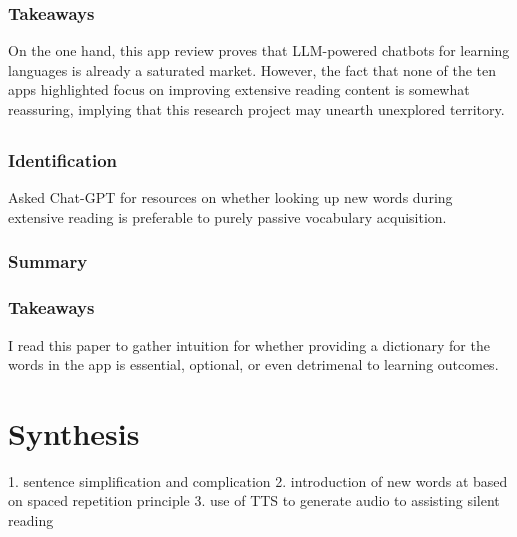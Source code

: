 \documentclass[
	letterpaper, %
]{jdf}
\begin{document}
\subsubsection{Takeaways}
On the one hand, this app review proves that LLM-powered chatbots for learning languages is already a saturated market. However, the fact that none of the ten apps highlighted focus on improving extensive reading content is somewhat reassuring, implying that this research project may unearth unexplored territory.

\subsection{}
\subsubsection{Identification}
Asked Chat-GPT for resources on whether looking up new words during extensive reading is preferable to purely passive vocabulary acquisition.

\subsubsection{Summary}


\subsubsection{Takeaways}
I read this paper to gather intuition for whether providing a dictionary for the words in the app is essential, optional, or even detrimenal to learning outcomes.


\section{Synthesis}
1. sentence simplification and complication
2. introduction of new words at based on spaced repetition principle
3. use of TTS to generate audio to assisting silent reading
\end{document}

